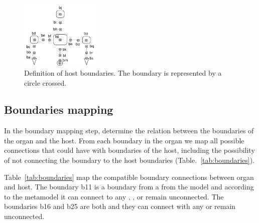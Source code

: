 \begin{figure}[h]
    \centering
    \includegraphics[width=0.35\textwidth]{Figures/host_boundaries.png}
    \caption{Definition of host boundaries. The boundary is represented by a circle crossed.}
    \label{fig:host_bound}
\end{figure}

\subsection{Boundaries mapping}

In the boundary mapping step, \ApproachName{} determine the relation between the boundaries of the organ and the host. From each boundary in the organ we map all possible connections that could have with boundaries of the host, including the possibility of not connecting the boundary to the host boundaries (Table.~\ref{tab:boundaries}). 

Table~\ref{tab:boundaries} map the compatible boundary connections between organ and host. The boundary b11 is a boundary from a  from the model and according to the metamodel it can connect to any , ,  or remain unconnected. The boundaries b16 and b25 are both  and they can connect with any  or remain unconnected.


